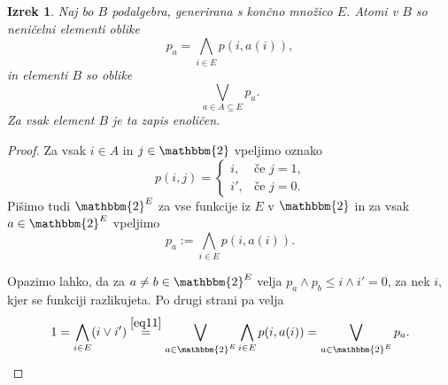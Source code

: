 \documentclass{amsart}
\newtheorem{izrek}{Izrek}[section]
\begin{document}
\begin{izrek}
    Naj bo $B$ podalgebra, generirana s končno množico $E$.
    Atomi v $B$ so neničelni elementi oblike 
    $$p_a = \bigwedge_{i\in E} p(i, a(i)),$$
    in elementi $B$ so oblike 
    \[\bigvee_{a \in A \subseteq E} p_a.\]
    Za vsak element $B$ je ta zapis enoličen.
\end{izrek}

\begin{proof}
    Za vsak \(i\in A\) in \(j \in \mathbbm{2}\) vpeljimo oznako 
    \[p(i,j) = 
    \begin{cases}
        i, & \text{če $j = 1$,} \\
        i', & \text{če $j = 0$.}
    \end{cases}\]
    Pišimo tudi \(\mathbbm{2}^{E}\) za vse funkcije iz 
    $E$ v $\mathbbm{2}$ in za vsak \(a \in \mathbbm{2}^{E}\) vpeljimo
    \[p_a := \bigwedge_{i \in E} p(i, a(i)).\]

    \noindent Opazimo lahko, da za $a\neq b \in \mathbbm{2}^{E}$ velja 
    $p_a \wedge p_b \leq i\wedge i'  = 0$, za nek $i$, kjer se funkciji razlikujeta.
    Po drugi strani pa velja
    \begin{align}
        \label{eq12}
        1 = \bigwedge_{i \in E} (i \vee i') \stackrel{\eqref{eq11}}{=} \bigvee_{a \in \mathbbm{2}^{E}} 
        \bigwedge_{i \in E} p(i, a(i)) = \bigvee_{a \in \mathbbm{2}^{E}} p_a.
    \end{align}


\end{proof}
\end{document}
